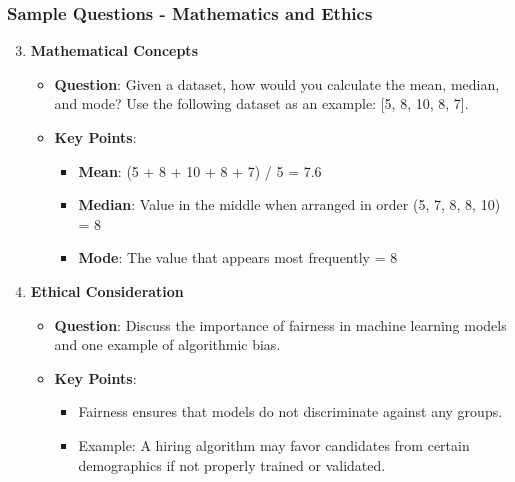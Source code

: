 \documentclass[aspectratio=169]{beamer}
\begin{document}
\begin{frame}[fragile]
    \frametitle{Sample Questions - Mathematics and Ethics}
    \begin{enumerate}
        \setcounter{enumi}{2} %
        \item \textbf{Mathematical Concepts}
        \begin{itemize}
            \item \textbf{Question}: Given a dataset, how would you calculate the mean, median, and mode? Use the following dataset as an example: [5, 8, 10, 8, 7].
            \item \textbf{Key Points}:
            \begin{itemize}
                \item \textbf{Mean}: (5 + 8 + 10 + 8 + 7) / 5 = 7.6
                \item \textbf{Median}: Value in the middle when arranged in order (5, 7, 8, 8, 10) = 8
                \item \textbf{Mode}: The value that appears most frequently = 8
            \end{itemize}
        \end{itemize}

        \item \textbf{Ethical Consideration}
        \begin{itemize}
            \item \textbf{Question}: Discuss the importance of fairness in machine learning models and one example of algorithmic bias.
            \item \textbf{Key Points}:
            \begin{itemize}
                \item Fairness ensures that models do not discriminate against any groups.
                \item Example: A hiring algorithm may favor candidates from certain demographics if not properly trained or validated.
            \end{itemize}
        \end{itemize}
    \end{enumerate}
\end{frame}
\end{document}
